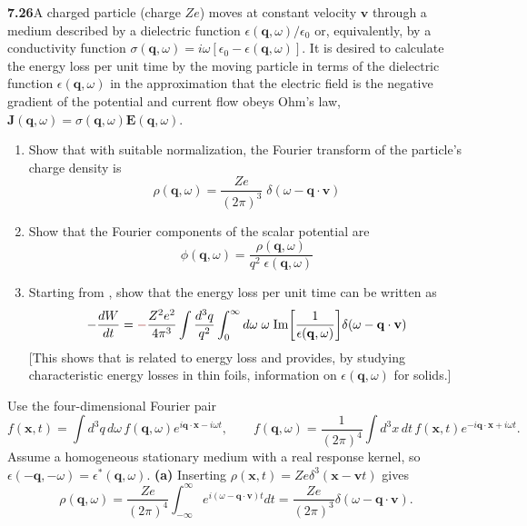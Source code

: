 \par\bigskip
\noindent\textbf{7.26}\quad A charged particle (charge $Ze$) moves at constant velocity $\mathbf{v}$ through a medium described by a dielectric function $\epsilon(\mathbf{q},\omega)/\epsilon_{0}$ or, equivalently, by a conductivity function $\sigma(\mathbf{q},\omega)=i\omega[\epsilon_{0}-\epsilon(\mathbf{q},\omega)]$. It is desired to calculate the energy loss per unit time by the moving particle in terms of the dielectric function $\epsilon(\mathbf{q},\omega)$ in the approximation that the electric field is the negative gradient of the potential and current flow obeys Ohm's law, $\mathbf{J}(\mathbf{q},\omega)=\sigma(\mathbf{q},\omega)\mathbf{E}(\mathbf{q},\omega)$.
\begin{enumerate}
\item[(a)] Show that with suitable normalization, the Fourier transform of the particle's charge density is
\[
\rho(\mathbf{q},\omega)=\frac{Ze}{(2\pi)^{3}}\;\delta(\omega-\mathbf{q}\cdot\mathbf{v})
\]
\item[(b)] Show that the Fourier components of the scalar potential are
\[
\phi(\mathbf{q},\omega)=\frac{\rho(\mathbf{q},\omega)}{q^{2}\;\epsilon(\mathbf{q},\omega)}
\]
\item[(c)] Starting from , show that the energy loss per unit time can be written as
\[
-\frac{dW}{dt}=\erratum{-}\frac{Z^{2}e^{2}}{4\pi^{3}}\int\frac{d^{3}q}{q^{2}}\int_{0}^{\infty}d\omega\;\omega\;\mathrm{Im}\!\left[\frac{1}{\epsilon(\mathbf{q},\omega)}\right]\!\delta(\omega-\mathbf{q}\cdot\mathbf{v})
\]
[This shows that  is related to energy loss and provides, by studying characteristic energy losses in thin foils, information on $\epsilon(\mathbf{q},\omega)$ for solids.]
\end{enumerate}
\solution
Use the four-dimensional Fourier pair
\[
f(\mathbf x,t)=\int d^3q\,d\omega\,
 f(\mathbf q,\omega)e^{i\mathbf q\cdot\mathbf x-i\omega t},\qquad
f(\mathbf q,\omega)=\frac1{(2\pi)^4}\int d^3x\,dt\,
 f(\mathbf x,t)e^{-i\mathbf q\cdot\mathbf x+i\omega t}.
\]
Assume a homogeneous stationary medium with a real response kernel,
so $\epsilon(-\mathbf q,-\omega)=\epsilon^*(\mathbf q,\omega)$.
\textbf{(a)} Inserting
$\rho(\mathbf x,t)=Ze\delta^3(\mathbf x-\mathbf vt)$ gives
\[
\rho(\mathbf q,\omega)=\frac{Ze}{(2\pi)^4}
\int_{-\infty}^{\infty}e^{i(\omega-\mathbf q\cdot\mathbf v)t}dt
=\boxed{\frac{Ze}{(2\pi)^3}\delta(\omega-\mathbf q\cdot\mathbf v).}
\]
